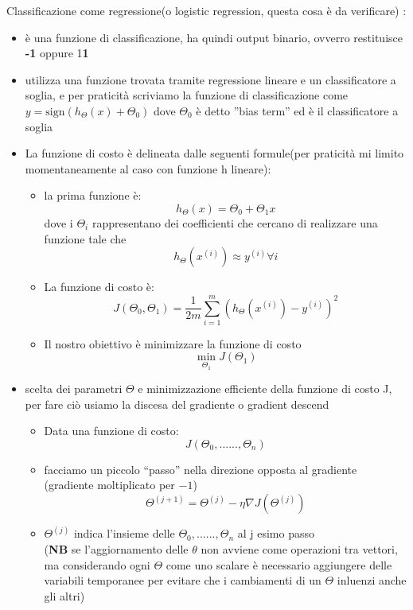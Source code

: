 \documentclass[10pt,oneside,a4paper]{article}
\begin{document}
Classificazione come regressione(o logistic regression, questa cosa è da verificare) :
\begin{itemize}
\item è una funzione di classificazione, ha quindi output binario, ovverro restituisce \textbf{-1} oppure 1\textbf{1}
\item utilizza una funzione trovata tramite regressione lineare e un classificatore a soglia, e per praticità scriviamo la funzione di classificazione come $y = \mathrm{sign}(h_{\Theta}(x)+\Theta_{0})$ dove $\Theta_{0}$ è detto ''bias term'' ed è il classificatore a soglia
\item La funzione di costo è delineata dalle seguenti formule(per praticità mi limito momentaneamente al caso con funzione h lineare):
 \begin{itemize}
 \item la prima funzione è:
  $$h_{\Theta}(x)=\Theta_{0}+\Theta_{1}x$$
 dove i $\Theta_{i}$ rappresentano dei coefficienti che cercano di realizzare una funzione tale che 
 $$h_{\Theta}(x^{(i)})\approx y^{(i)}  \forall i$$
 
 \item La funzione di costo è:
 $$J(\Theta_{0},\Theta_{1})= \frac{1}{2m} \sum_{i=1}^{m}(h_{\Theta}(x^{(i)})-y^{(i)})^2$$
 \item Il nostro obiettivo è minimizzare la funzione di costo
 $$\min_{\Theta_{1}} J(\Theta_{1})$$
 
 \end{itemize}
 
 \item scelta dei parametri $\Theta$ e minimizzazione efficiente della funzione di costo J,
 per fare ciò usiamo la discesa del gradiente o gradient descend
 \begin{itemize}
\item Data una funzione di costo:
$$J(\Theta_{0},......,\Theta_{n})$$
\item facciamo un piccolo ``passo'' nella direzione opposta al gradiente (gradiente moltiplicato per $-1$)
$$\Theta^{(j+1)} = \Theta^{(j)}-\eta \nabla J(\Theta^{(j)})$$
\item $\Theta^{(j)}$ indica l'insieme delle $\Theta_{0},......,\Theta_{n}$ al j esimo passo \\
(\textbf{NB} se l'aggiornamento delle $\theta $ non avviene come operazioni tra vettori, ma considerando ogni $\Theta$ come uno scalare è necessario aggiungere delle variabili temporanee per evitare che i cambiamenti di un $\Theta$ inluenzi anche gli altri)


\end{itemize}
\end{itemize}
\end{document}

